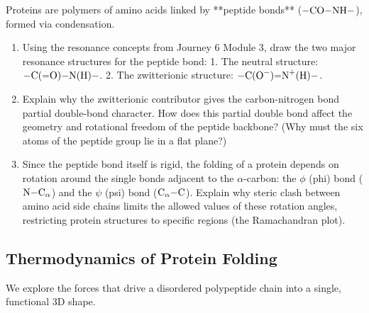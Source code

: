 \documentclass[12pt, a4paper]{book}
\begin{document}
\begin{explobox}
Proteins are polymers of amino acids linked by **peptide bonds** ($\ce{-CO-NH-}$), formed via condensation.
\begin{enumerate}[label=(\alph*), leftmargin=*]
  \item Using the resonance concepts from Journey 6 Module 3, draw the two major resonance structures for the peptide bond:
        1. The neutral structure: $\ce{-C(=O)-N(H)-}$.
        2. The zwitterionic structure: $\ce{-C(O^-)=N^+(H)-}$.
  \item Explain why the zwitterionic contributor gives the carbon-nitrogen bond partial double-bond character.
        How does this partial double bond affect the geometry and rotational freedom of the peptide backbone? (Why must the six atoms of the peptide group lie in a flat plane?)
  \item Since the peptide bond itself is rigid, the folding of a protein depends on rotation around the single bonds adjacent to the $\alpha$-carbon: the $\phi$ (phi) bond ($\ce{N-C_\alpha}$) and the $\psi$ (psi) bond ($\ce{C_\alpha-C}$).
        Explain why steric clash between amino acid side chains limits the allowed values of these rotation angles, restricting protein structures to specific regions (the Ramachandran plot).
\end{enumerate}
\end{explobox}

\subsection{Thermodynamics of Protein Folding}

We explore the forces that drive a disordered polypeptide chain into a single, functional 3D shape.
\end{document}
